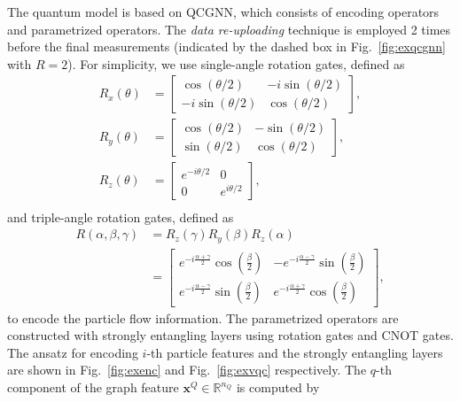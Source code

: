 \documentclass[reprint,amsmath,amssymb,prd,nofootinbib]{revtex4-2}
\def\xbf{\mathbf{x}}
\begin{document}
The quantum model is based on QCGNN, which consists of encoding operators and parametrized operators. The \textit{data re-uploading} technique \cite{reupload} is employed 2 times before the final measurements (indicated by the dashed box in Fig.~\ref{fig:exqcgnn} with $R=2$). For simplicity, we use single-angle rotation gates, defined as
\begin{equation} \label{sin_rotgate}
    \begin{split}
        R_x(\theta) &= 
        \begin{bmatrix}
            \cos(\theta/2) & -i\sin(\theta/2)\\
            -i\sin(\theta/2) & \cos(\theta/2)
        \end{bmatrix},\\
        R_y(\theta) &= 
        \begin{bmatrix}
            \cos(\theta/2) & -\sin(\theta/2)\\
            \sin(\theta/2) & \cos(\theta/2)
        \end{bmatrix},\\
        R_z(\theta) &= 
        \begin{bmatrix}
            e^{-i\theta/2} & 0\\
            0 & e^{i\theta/2}
        \end{bmatrix},\\
    \end{split}
\end{equation}
and triple-angle rotation gates, defined as
\begin{equation} \label{tri_rotgate}
    \begin{split}
        R(\alpha, \beta, \gamma) &= R_z(\gamma)R_y(\beta)R_z(\alpha) \\
        &=
        \begin{bmatrix}
            e^{-i\frac{\alpha+\gamma}{2}}\cos(\frac{\beta}{2}) & -e^{-i\frac{\alpha-\gamma}{2}}\sin(\frac{\beta}{2})\\
            e^{-i\frac{\alpha-\gamma}{2}}\sin(\frac{\beta}{2}) & e^{-i\frac{\alpha+\gamma}{2}}\cos(\frac{\beta}{2})
        \end{bmatrix},
    \end{split}
\end{equation}
to encode the particle flow information. The parametrized operators are constructed with strongly entangling layers \cite{strong_ent} using rotation gates and CNOT gates. The ansatz for encoding $i$-th particle features and the strongly entangling layers are shown in Fig.~\ref{fig:exenc} and Fig.~\ref{fig:exvqc} respectively. The $q$-th component of the graph feature $\xbf^Q\in\mathbb{R}^{n_Q}$ is computed by
\end{document}
